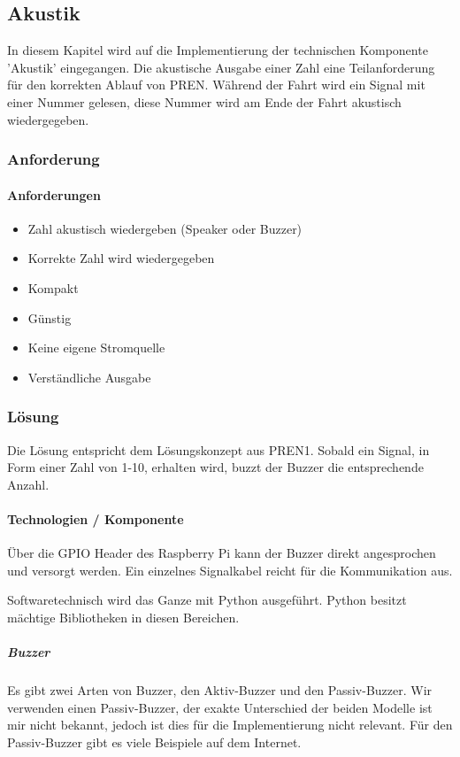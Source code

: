 \documentclass[../../main.tex]{subfiles}
\begin{document}
\subsection{Akustik}
In diesem Kapitel wird auf die Implementierung der technischen Komponente 'Akustik' eingegangen. Die akustische Ausgabe einer Zahl eine Teilanforderung für den korrekten Ablauf von PREN. Während der Fahrt wird ein Signal mit einer Nummer gelesen, diese Nummer wird am Ende der Fahrt akustisch wiedergegeben.

\subsubsection{Anforderung}

\paragraph{Anforderungen}
\begin{itemize}
    \item Zahl akustisch wiedergeben (Speaker oder Buzzer)
    \item Korrekte Zahl wird wiedergegeben
    \item Kompakt
    \item Günstig
    \item Keine eigene Stromquelle
    \item Verständliche Ausgabe
\end{itemize}

\subsubsection{Lösung}
Die Lösung entspricht dem Lösungskonzept aus PREN1. Sobald ein Signal, in Form einer Zahl von 1-10, erhalten wird, buzzt der Buzzer die entsprechende Anzahl.

\paragraph{Technologien / Komponente}
Über die GPIO Header des Raspberry Pi kann der Buzzer direkt angesprochen und versorgt werden. Ein einzelnes Signalkabel reicht für die Kommunikation aus.

Softwaretechnisch wird das Ganze mit Python ausgeführt. Python besitzt mächtige Bibliotheken in diesen Bereichen.

\subparagraph{Buzzer}
Es gibt zwei Arten von Buzzer, den Aktiv-Buzzer und den Passiv-Buzzer. Wir verwenden einen Passiv-Buzzer, der exakte Unterschied der beiden Modelle ist mir nicht bekannt, jedoch ist dies für die Implementierung nicht relevant. Für den Passiv-Buzzer gibt es viele Beispiele auf dem Internet. 
\end{document}
